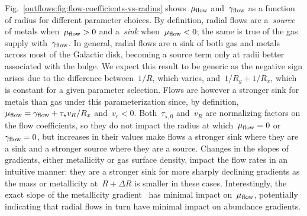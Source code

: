 Fig.~\ref{outflows:fig:flow-coefficients-vs-radius} shows~$\mu_{\text{flow}}$
and~$\gamma_{\text{flow}}$ as a function of radius for different parameter choices.
By definition, radial flows are a~\textit{source} of metals when~$\mu_{\text{flow}} > 0$
and a~\textit{sink} when~$\mu_{\text{flow}} < 0$; the same is true of the gas supply
with~$\gamma_{\text{flow}}$.
In general, radial flows are a sink of both gas and metals across most of the
Galactic disk, becoming a source term only at radii better associated with the
bulge.
We expect this result to be generic as the negative sign arises due to the
difference between~$1 / R$, which varies, and~$1 / R_g + 1 / R_x$, which is
constant for a given parameter selection.
Flows are however a stronger sink for metals than gas under this
parameterization since, by definition,~$\mu_{\text{flow}} = \gamma_{\text{flow}} + \tau_\star
v_R / R_x$ and~$v_r < 0$.
Both~$\tau_{\star,0}$ and~$v_R$ are normalizing factors on the flow
coefficients, so they do not impact the radius at which~$\mu_{\text{flow}} = 0$ or
$\gamma_{\text{flow}} = 0$, but increases in their values make flows a stronger sink
where they are a sink and a stronger source where they are a source.
Changes in the slopes of gradients, either metallicity or gas surface density,
impact the flow rates in an intuitive manner: they are a stronger sink for more
sharply declining gradients as the mass or metallicity at~$R + \Delta R$ is
smaller in these cases.
Interestingly, the exact slope of the metallicity gradient~ has minimal
impact on~$\mu_{\text{flow}}$, potentially indicating that radial flows in turn have
minimal impact on abundance gradients.

